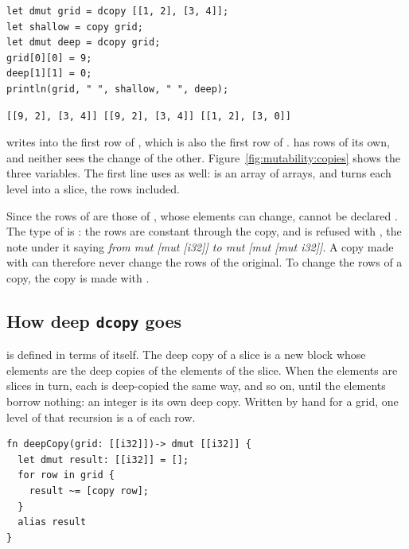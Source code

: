 \begin{lstlisting}[style=coloredverbatim]
let dmut grid = dcopy [[1, 2], [3, 4]];
let shallow = copy grid;
let dmut deep = dcopy grid;
grid[0][0] = 9;
deep[1][1] = 0;
println(grid, " ", shallow, " ", deep);
\end{lstlisting}
\vspace{-10pt}%
\begin{lstlisting}[style=bashVerb]
[[9, 2], [3, 4]] [[9, 2], [3, 4]] [[1, 2], [3, 0]]
\end{lstlisting}

 writes into the first row of , which is also
the first row of .  has rows of its own, and neither
sees the change of the other. Figure~\ref{fig:mutability:copies} shows the three
variables. The first line uses  as well: \token{[[1, 2], [3, 4]]}
is an array of arrays, and  turns each level into a slice, the
rows included.



Since the rows of  are those of , whose elements can
change,  cannot be declared . The type of
 is : the rows are constant through the
copy, and  is refused with
, the note under
it saying \textit{from mut [mut [i32]] to mut [mut [mut i32]]}. A copy made
with  can therefore never change the rows of the original. To
change the rows of a copy, the copy is made with .

\subsection{How deep \texttt{dcopy} goes}

 is defined in terms of itself. The deep copy of a slice is a new
block whose elements are the deep copies of the elements of the slice. When the
elements are slices in turn, each is deep-copied the same way, and so on, until
the elements borrow nothing: an integer is its own deep copy. Written by hand
for a grid, one level of that recursion is a  of each row.

\begin{lstlisting}[style=coloredverbatim]
fn deepCopy(grid: [[i32]])-> dmut [[i32]] {
  let dmut result: [[i32]] = [];
  for row in grid {
    result ~= [copy row];
  }
  alias result
}
\end{lstlisting}

